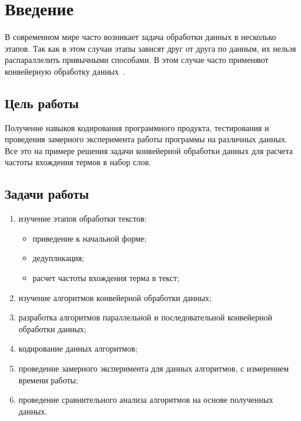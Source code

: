 \setcounter{page}{3}
\chapter*{Введение}

В современном мире часто возникает задача обработки данных в несколько этапов. 
Так как в этом случаи этапы зависят друг от друга по данным, их нельзя распараллелить привычными способами. 
В этом случае часто применяют конвейерную обработку данных~\cite{bib:1}.

\section*{Цель работы}

Получение навыков кодирования программного продукта, тестирования и проведения замерного эксперимента работы программы на различных данных. Все это на примере решения задачи конвейерной обработки данных для расчета частоты вхождения термов в набор слов.

\section*{Задачи работы}

\begin{enumerate}[label={\arabic*)}]
	\item изучение этапов обработки текстов:
	\begin{itemize}
		\item приведение к начальной форме;
		\item дедупликация;
		\item расчет частоты вхождения терма в текст;
	\end{itemize}
	\item изучение алгоритмов конвейерной обработки данных;
	\item разработка алгоритмов параллельной и последовательной конвейерной обработки данных;
	\item кодирование данных алгоритмов;
	\item проведение замерного эксперимента для данных алгоритмов, с измерением времени работы; 
	\item проведение сравнительного анализа алгоритмов на основе полученных данных.
\end{enumerate}

\newpage